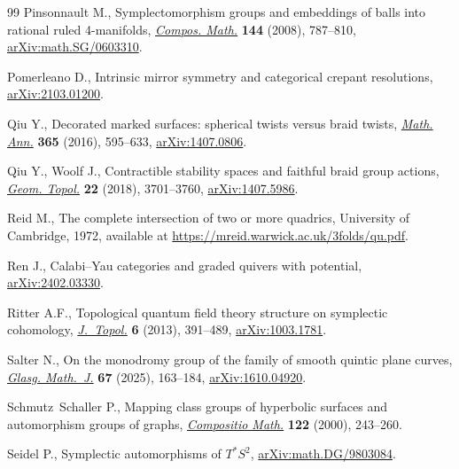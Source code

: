 \documentclass[10pt,a4paper]{amsart}
\theoremstyle{definition}
\numberwithin{equation}{section}
\begin{document}
\begin{thebibliography}{99}
Pinsonnault M., Symplectomorphism groups and embeddings of balls into rational
 ruled 4-manifolds,
 \href{https://doi.org/10.1112/S0010437X0700334X}{\textit{Compos. Math.}}
 \textbf{144} (2008), 787--810,
 \href{http://arxiv.org/abs/math.SG/0603310}{arXiv:math.SG/0603310}.

Pomerleano D., Intrinsic mirror symmetry and categorical crepant resolutions,
 \href{http://arxiv.org/abs/2103.01200}{arXiv:2103.01200}.

Qiu Y., Decorated marked surfaces: spherical twists versus braid twists,
 \href{https://doi.org/10.1007/s00208-015-1339-0}{\textit{Math. Ann.}}
 \textbf{365} (2016), 595--633,
 \href{http://arxiv.org/abs/1407.0806}{arXiv:1407.0806}.

Qiu Y., Woolf J., Contractible stability spaces and faithful braid group
 actions, \href{https://doi.org/10.2140/gt.2018.22.3701}{\textit{Geom.
 Topol.}} \textbf{22} (2018), 3701--3760,
 \href{http://arxiv.org/abs/1407.5986}{arXiv:1407.5986}.

Reid M., The complete intersection of two or more quadrics, {U}niversity of
 Cambridge, 1972, available at
 \url{https://mreid.warwick.ac.uk/3folds/qu.pdf}.

Ren J., Calabi--{Y}au categories and graded quivers with potential,
 \href{http://arxiv.org/abs/2402.03330}{arXiv:2402.03330}.

Ritter A.F., Topological quantum field theory structure on symplectic
 cohomology, \href{https://doi.org/10.1112/jtopol/jts038}{\textit{J.~Topol.}}
 \textbf{6} (2013), 391--489,
 \href{http://arxiv.org/abs/1003.1781}{arXiv:1003.1781}.

Salter N., On the monodromy group of the family of smooth quintic plane curves,
 \href{https://doi.org/10.1017/S0017089524000284}{\textit{Glasg. Math.~J.}}
 \textbf{67} (2025), 163--184,
 \href{http://arxiv.org/abs/1610.04920}{arXiv:1610.04920}.

Schmutz~Schaller P., Mapping class groups of hyperbolic surfaces and
 automorphism groups of graphs,
 \href{https://doi.org/10.1023/A:1002672721132}{\textit{Compositio Math.}}
 \textbf{122} (2000), 243--260.

Seidel P., Symplectic automorphisms of ${T}^*{S}^2$,
 \href{http://arxiv.org/abs/math.DG/9803084}{arXiv:math.DG/9803084}.



\end{thebibliography}
\end{document}
